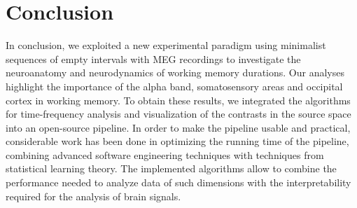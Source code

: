 

\chapter*{Conclusion}

In conclusion, we exploited a new experimental paradigm using minimalist sequences of empty intervals with MEG recordings to investigate the neuroanatomy and neurodynamics of working memory durations. Our analyses highlight the importance of the alpha band, somatosensory areas and occipital cortex in working memory. To obtain these results, we integrated the algorithms for time-frequency analysis and visualization of the contrasts in the source space into an open-source pipeline. In order to make the pipeline usable and practical, considerable work has been done in optimizing the running time of the pipeline, combining advanced software engineering techniques with techniques from statistical learning theory. The implemented algorithms allow to combine the performance needed to analyze data of such dimensions with the interpretability required for the analysis of brain signals.